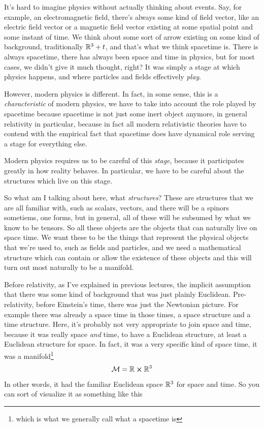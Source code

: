		It's hard to imagine physics without actually thinking about events. Say, for example, an electromagnetic field,
		there's always some kind of field vector, like an electric field vector or a magnetic field vector
		existing at some spatial point and some instant of time. We think about some sort of arrow
		existing on some kind of background, traditionally $\mathbb{R}^3 + t$, and that's what we think 
		spacetime is. There is always spacetime, there has always been space and time in physics,
		but for most cases, we didn't give it much thought, right? It was simply a stage at which
		physics happens, and where particles and fields effectively \textit{play}. 

		However, modern physics is different. In fact, in some sense, this is a \textit{characteristic} of 
		modern physics, we have to take into account the role played by spacetime because spacetime
		is not just some inert object anymore, in general relativity in particular, because in fact all
		modern relativistic theories have to contend with the empirical fact that spacetime does have
		dynamical role serving a stage for everything else.

		Modern physics requires us to be careful of this \textit{stage}, because it participates 
		greatly in how reality behaves. In particular, we have to be careful about the structures which
		live on this stage. 

		So what am I talking about here, what \textit{structures}? These are structures that we are 
		all familiar with, such as scalars, vectors, and there will be a spinors sometiems, one forms,
		but in general, all of these will be subsumed by what we know to be tensors. So all these objects
		are the objects that can naturally live on space time. We want these to be the things that represent
		the physical objects that we're used to, such as fields and particles, and we need a mathematical
		structure which can contain or allow the existence of these objects and this will turn out 
		most naturally to be a manifold. 

		Before relativity, as I've explained in previous lectures, the implicit assumption that
		there was some kind of background that was just plainly Euclidean. Pre-relativity, before
		Einstein's time, there was just the Newtonian picture. For example there was already
		a space time in those times, a space structure and a time structure. Here, it's probably
		not very appropriate to join space and time, because it was really space \textit{and} time,
		to have a Euclidean structure, at least a Euclidean structure for space. In fact, it was a 
		very specific kind of space time, it was a manifold\footnote{which is what we generally call what a spacetime is}
		\begin{equation}
			\label{eq:manifold}
				\mathcal{M} = \mathbb{R}\cross\mathbb{R}^3
		\end{equation}
		In other words, it had the familiar Euclidean space $\mathbb{R}^3$ for space and time. So you can sort of 
		visualize it as something like this

